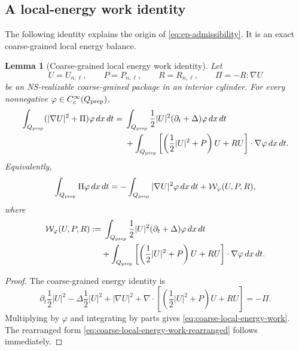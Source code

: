 \documentclass[11pt]{article}
\numberwithin{equation}{section}
\theoremstyle{plain}
\newtheorem{lemma}[theorem]{Lemma}
\theoremstyle{definition}
\theoremstyle{remark}
\newcommand{\calW}{\mathcal W}
\begin{document}
\subsection{A local-energy work identity}

The following identity explains the origin of \eqref{eq:ep-admissibility}.  It is an exact coarse-grained local energy balance.

\begin{lemma}[Coarse-grained local energy work identity]
\label{lem:coarse-local-energy-work}
Let
\[
        U=U_{n,\ell},
        \qquad
        P=P_{n,\ell},
        \qquad
        R=R_{n,\ell},
        \qquad
        \Pi=-R:\nabla U
\]
be an NS-realizable coarse-grained package in an interior cylinder.  For every nonnegative \(\varphi\in C_c^\infty(Q_{\rm prep})\),
\begin{align}
        \int_{Q_{\rm prep}}
        (|\nabla U|^2+\Pi)\varphi\,dx\,dt
        ={}&
        \int_{Q_{\rm prep}}
        \frac12|U|^2(\partial_t+\Delta)\varphi\,dx\,dt
        \notag\\
        &+
        \int_{Q_{\rm prep}}
        \left[
            \left(\frac12|U|^2+P\right)U+RU
        \right]\cdot\nabla\varphi\,dx\,dt.
        \label{eq:coarse-local-energy-work}
\end{align}
Equivalently,
\begin{equation}
        \int_{Q_{\rm prep}}\Pi\varphi\,dx\,dt
        =
        -\int_{Q_{\rm prep}}|\nabla U|^2\varphi\,dx\,dt
        +
        \calW_\varphi(U,P,R),
        \label{eq:coarse-local-energy-work-rearranged}
\end{equation}
where
\begin{align}
        \calW_\varphi(U,P,R)
        :=&\
        \int_{Q_{\rm prep}}
        \frac12|U|^2(\partial_t+\Delta)\varphi\,dx\,dt
        \notag\\
        &+
        \int_{Q_{\rm prep}}
        \left[
            \left(\frac12|U|^2+P\right)U+RU
        \right]\cdot\nabla\varphi\,dx\,dt.
        \label{eq:work-functional}
\end{align}
\end{lemma}

\begin{proof}
The coarse-grained energy identity is
\[
        \partial_t\frac12|U|^2
        -
        \Delta\frac12|U|^2
        +
        |\nabla U|^2
        +
        \nabla\cdot\left[
            \left(\frac12|U|^2+P\right)U+RU
        \right]
        =
        -\Pi.
\]
Multiplying by \(\varphi\) and integrating by parts gives \eqref{eq:coarse-local-energy-work}.  The rearranged form \eqref{eq:coarse-local-energy-work-rearranged} follows immediately.
\end{proof}
\end{document}
